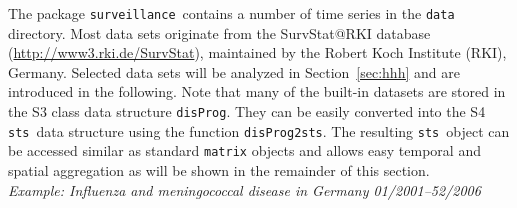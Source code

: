 \documentclass[a4paper,11pt]{article}
\newcommand{\surveillance}{\texttt{surveillance}}
\newcommand{\code}[1]{\texttt{#1}}
\newcommand{\sts}{\texttt{sts}}
\newcommand{\example}[1]{\textit{Example: #1}}
\begin{document}
The package \surveillance\ contains a number of time series in the \code{data}
directory. Most data sets originate from the SurvStat@RKI database 
(\url{http://www3.rki.de/SurvStat}), maintained by the Robert Koch Institute 
(RKI), Germany. Selected data sets will be analyzed in Section~\ref{sec:hhh} 
and are introduced in the following. Note that many of the built-in datasets 
are stored in the S3 class data structure \code{disProg}. 
They can be easily converted into the S4 \sts\ data structure using
the function \code{disProg2sts}. The resulting \sts\ object can be accessed 
similar as standard \code{matrix} objects and allows easy temporal and spatial
aggregation as will be shown in the remainder of this section. \\

\example{Influenza and meningococcal disease in Germany 01/2001--52/2006}
\end{document}
